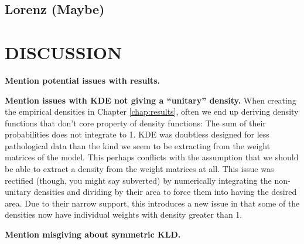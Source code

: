 \section{Lorenz (Maybe)}

\chapter{DISCUSSION}
\label{chap:discussion}

\textbf{Mention potential issues with results.}

\textbf{Mention issues with KDE not giving a ``unitary'' density.}
When creating the empirical densities in Chapter \ref{chap:results}, often we end up deriving 
density functions that don't core property of density functions: The sum of their probabilities 
does not integrate to 1. KDE was doubtless designed for less pathological data than the kind we
seem to be extracting from the weight matrices of the model. This perhaps conflicts with the 
assumption that we should be able to extract a density from the weight matrices at all. This issue
was rectified (though, you might say subverted) by numerically integrating the non-unitary densities
and dividing by their area to force them into having the desired area. Due to their narrow support,
this introduces a new issue in that some of the densities now have individual weights with density 
greater than 1.

\textbf{Mention misgiving about symmetric KLD.}